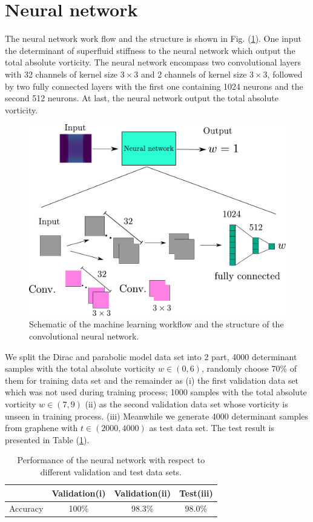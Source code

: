 \documentclass{article}
\begin{document}
\section{Neural network}
The neural network work flow and the structure is shown in Fig. (\ref{fig: Neural network}). One input the determinant of superfluid stiffness to the neural network which output the total absolute vorticity. The neural network encompass two convolutional layers with 32 channels of kernel size $ 3 \times 3 $ and 2 channels of kernel size $ 3 \times 3 $, followed by two fully connected layers with the first one containing 1024 neurons and the second 512 neurons. At last, the neural network output the total absolute vorticity. 
\begin{figure}[H]
    \centering
    \includegraphics[width=1\textwidth]{Neural network.pdf}
    \caption{Schematic of the machine learning workflow and the structure of the convolutional neural network.}
    \label{fig: Neural network}
\end{figure}

We split the Dirac and parabolic model data set into 2 part, 4000 determinant samples with the total absolute vorticity $ w \in \left(0,6\right) $, randomly choose $ 70\% $ of them for training data set and the remainder as (i) the first validation data set which was not used during training process; 1000 samples with the total absolute vorticity $ w \in \left(7,9\right) $ (ii) as the second validation data set whose vorticity is unseen in training process. (iii) Meanwhile we generate 4000 determinant samples from graphene with $ t \in \left(2000,4000\right) $ as test data set. The test result is presented in Table (\ref{tab:Performance}).

\begin{table}[H]
    \centering
    \begin{tabular}{c|c|c|c}
        \toprule
             & Validation(i)  & Validation(ii) & Test(iii)   \\
        \midrule
        Accuracy     & 100\% & 98.3\% &  98.0\%  \\
        \bottomrule
    \end{tabular}
    \caption{Performance of the neural network with respect to different validation and test data sets.}
    \label{tab:Performance}
\end{table}
\end{document}
